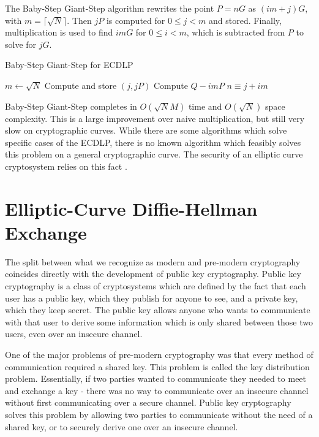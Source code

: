 \documentclass{article}
\begin{document}
The Baby-Step Giant-Step algorithm rewrites the point $P = nG$ as $(im + j)G$, with $m = \lceil \sqrt{N} \rceil$.
Then $jP$ is computed for $0 \leq j < m$ and stored.
Finally, multiplication is used to find $imG$ for $0 \leq i < m$, which is subtracted from $P$ to solve for $jG$.

\begin{algorithm}
\caption{Baby-Step Giant-Step for ECDLP}
\begin{algorithmic}
\State $m \gets \sqrt{N}$
	\State Compute and store $(j, jP)$
\EndFor
{}
	\State Compute $Q - imP$
		\State \Return $n \equiv j + im$
	\EndIf
\EndFor
\end{algorithmic}
\end{algorithm}

Baby-Step Giant-Step completes in $O(\sqrt{N} M)$ time and $O(\sqrt{N})$ space complexity.
This is a large improvement over naive multiplication, but still very slow on cryptographic curves. 
While there are some algorithms which solve specific cases of the ECDLP, there is no known algorithm which feasibly solves this problem on a general cryptographic curve.
The security of an elliptic curve cryptosystem relies on this fact \cite[\S 5]{washington}.

\clearpage

\section{Elliptic-Curve Diffie-Hellman Exchange}
The split between what we recognize as modern and pre-modern cryptography coincides directly with the development of public key cryptography.
Public key cryptography is a class of cryptosystems which are defined by the fact that each user has a public key, which they publish for anyone to see, and a private key, which they keep secret.
The public key allows anyone who wants to communicate with that user to derive some information which is only shared between those two users, even over an insecure channel.

One of the major problems of pre-modern cryptography was that every method of communication required a shared key.
This problem is called the key distribution problem.
Essentially, if two parties wanted to communicate they needed to meet and exchange a key - there was no way to communicate over an insecure channel without first communicating over a secure channel.
Public key cryptography solves this problem by allowing two parties to communicate without the need of a shared key, or to securely derive one over an insecure channel.
\end{document}
